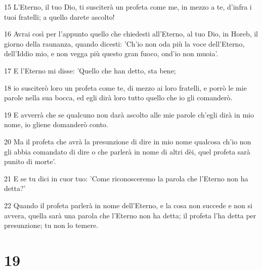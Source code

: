 \par 15 L'Eterno, il tuo Dio, ti susciterà un profeta come me, in mezzo a te, d'infra i tuoi fratelli; a quello darete ascolto!
\par 16 Avrai così per l'appunto quello che chiedesti all'Eterno, al tuo Dio, in Horeb, il giorno della raunanza, quando dicesti: 'Ch'io non oda più la voce dell'Eterno, dell'Iddio mio, e non vegga più questo gran fuoco, ond'io non muoia'.
\par 17 E l'Eterno mi disse: 'Quello che han detto, sta bene;
\par 18 io susciterò loro un profeta come te, di mezzo ai loro fratelli, e porrò le mie parole nella sua bocca, ed egli dirà loro tutto quello che io gli comanderò.
\par 19 E avverrà che se qualcuno non darà ascolto alle mie parole ch'egli dirà in mio nome, io gliene domanderò conto.
\par 20 Ma il profeta che avrà la presunzione di dire in mio nome qualcosa ch'io non gli abbia comandato di dire o che parlerà in nome di altri dèi, quel profeta sarà punito di morte'.
\par 21 E se tu dici in cuor tuo: 'Come riconosceremo la parola che l'Eterno non ha detta?'
\par 22 Quando il profeta parlerà in nome dell'Eterno, e la cosa non succede e non si avvera, quella sarà una parola che l'Eterno non ha detta; il profeta l'ha detta per presunzione; tu non lo temere.

\chapter{19}

